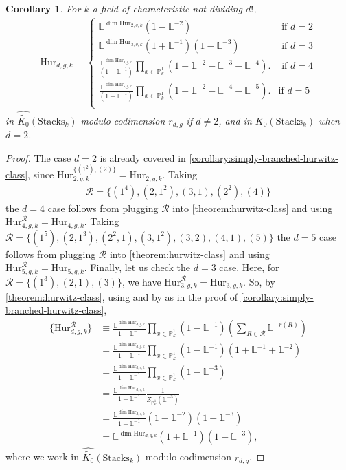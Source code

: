 \documentclass[12 pt]{amsart}
\theoremstyle{plain}
\newtheorem{corollary}[theorem]{Corollary}
\theoremstyle{definition}
\theoremstyle{remark}
\numberwithin{equation}{section}
\newcommand\bl{\mathbb L}
\newcommand\bp{\mathbb P}
\newcommand\hur[3]{\mathrm{Hur}_{#1,#2,#3}} %
\newcommand\rhur[4]{\mathrm{Hur}_{#1,#2,#3}^{#4}} %
\newcommand\codimbound[2]{r_{#1,#2}} %
\newcommand\grcSpaces{\widehat{\widetilde{K_0}}(\mathrm{Spaces}_k)} %
\newcommand\grStacks{K_0(\mathrm{Stacks}_k)} %
\newcommand\grcStacks{\widehat{\widetilde{K_0}}(\mathrm{Stacks}_k)} %
\begin{document}
\begin{corollary} \label{corollary:full-hurwitz-class} For $k$ a field of
	characteristic not dividing $d!$, \begin{align*} \hur d g k\equiv
		\begin{cases} \bl^{\dim{\hur 2 g k}}(1-\bl^{-2})	 &
			\text{ if } d = 2 \\ \bl^{\dim{\hur 3 g k}} (1+\bl^{-1})
			\left( 1 - \bl^{-3} \right) & \text{ if } d = 3 \\
			\frac{\bl^{\dim{\hur 4 g k }}}{(1-\bl^{-1})} \prod_{x
			\in \bp^1_k} \left(1+\bl^{-2} - \bl^{-3} - \bl^{-4}
			\right).  & \text{ if } d= 4 \\ \frac{\bl^{\dim{\hur 5 g
			k}}}{(1-\bl^{-1})} \prod_{x \in \bp^1_k}
			\left(1+\bl^{-2}- \bl^{-4} - \bl^{-5} \right).  & \text{
	if } d = 5 \\ \end{cases} \end{align*} in $\grcStacks$	modulo
	codimension $\codimbound d g$ if $d \neq 2$, and in $\grStacks$ when $d =2$.
\end{corollary} \begin{proof} The case $d = 2$ is already covered in
	\autoref{corollary:simply-branched-hurwitz-class}, since $\rhur 2 g
	k{\{(1^2), (2)\}} = \hur 2 g k$.  Taking 
	\begin{align*}
		\mathcal R = \{(1^4), (2,
	1^2), (3, 1), (2^2), (4)\}
	\end{align*}
the $d = 4$ case follows from plugging
	$\mathcal R$ into \autoref{theorem:hurwitz-class} and using $\rhur 4 g
	k{\mathcal R} = \hur 4 g k$.  Taking $\mathcal R = \{(1^5), (2, 1^3),
	(2^2, 1), (3, 1^2), (3, 2), (4, 1), (5)\}$ the $d = 5$ case follows from
	plugging $\mathcal R$ into \autoref{theorem:hurwitz-class} and using
	$\rhur 5 g k{\mathcal R} = \hur 5 g k$.  Finally, let us check the $d =
	3$ case.  Here, for $\mathcal R = \{(1^3), (2,1), (3)\}$, we have $\rhur
	3 g k{\mathcal R} = \hur 3 g k$.  So, by
	\autoref{theorem:hurwitz-class}, 
	using \cite[\S3.8, Property 4]{bilu:thesis} and 
	by \cite[Ex.\
		6.1.12]{biluH:motivic-euler-products-in-motivic-statistics}
		as in the proof of
		\autoref{corollary:simply-branched-hurwitz-class},
	\begin{align*} \{\rhur d g
		k{\mathcal R}\} &\equiv \frac{\bl^{\dim{\hur d g k}}}{1-\bl^{-1}}
		\prod_{x \in \bp^1_k} (1-\bl^{-1})\left( \sum_{R \in \mathcal R}
		\bl^{-r(R)} \right) \\ &= \frac{\bl^{\dim{\hur d g
	k}}}{1-\bl^{-1}} \prod_{x \in \bp^1_k} (1-\bl^{-1})\left( 1 + \bl^{-1} + \bl^{-2} \right) \\ &= \frac{\bl^{\dim{\hur d g
k}}}{1-\bl^{-1}} \prod_{x \in \bp^1_k} (1-\bl^{-3})\\ &= \frac{\bl^{\dim{\hur d
g k}}}{1-\bl^{-1}} \frac{1}{Z_{\bp^1_k}(\bl^{-3})}\\ &= \frac{\bl^{\dim{\hur d g
k}}}{1-\bl^{-1}} \left( 1-\bl^{-2} \right)\left( 1-\bl^{-3} \right)\\ &=
\bl^{\dim{\hur d g k}} (1+\bl^{-1}) \left( 1-\bl^{-3} \right), \end{align*} where
we work in $\grcStacks$ modulo codimension $\codimbound d g$.  \end{proof}
\end{document}
